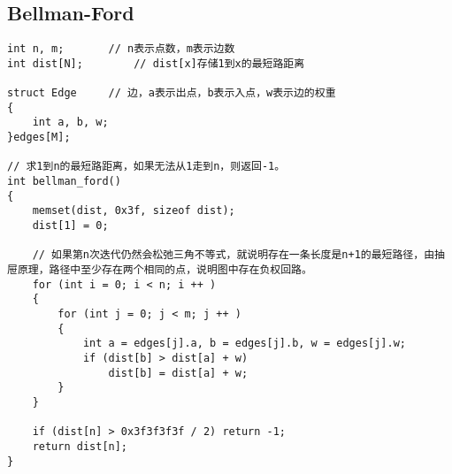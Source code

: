 \documentclass[12pt,a4paper,UTF16]{ctexbook}
\theoremstyle{plain}
\begin{document}
\subsection{Bellman-Ford}
\begin{lstlisting}
int n, m;       // n表示点数，m表示边数
int dist[N];        // dist[x]存储1到x的最短路距离

struct Edge     // 边，a表示出点，b表示入点，w表示边的权重
{
    int a, b, w;
}edges[M];

// 求1到n的最短路距离，如果无法从1走到n，则返回-1。
int bellman_ford()
{
    memset(dist, 0x3f, sizeof dist);
    dist[1] = 0;

    // 如果第n次迭代仍然会松弛三角不等式，就说明存在一条长度是n+1的最短路径，由抽屉原理，路径中至少存在两个相同的点，说明图中存在负权回路。
    for (int i = 0; i < n; i ++ )
    {
        for (int j = 0; j < m; j ++ )
        {
            int a = edges[j].a, b = edges[j].b, w = edges[j].w;
            if (dist[b] > dist[a] + w)
                dist[b] = dist[a] + w;
        }
    }

    if (dist[n] > 0x3f3f3f3f / 2) return -1;
    return dist[n];
}
\end{lstlisting}
\end{document}
